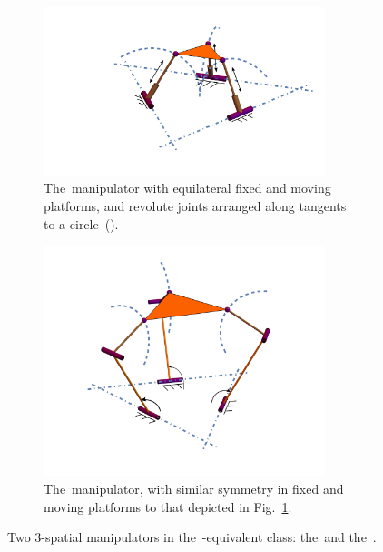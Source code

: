 \documentclass[DD]{iitmdiss}
\newcommand{\mref}[1]{\ref{#1}}
\newcommand{\mcite}[1]{\cite{#1}}
\newcommand{\mlabel}[1]{\label{#1}}
\begin{document}
\begin{figure}[h]
	\centering
	\begin{subfigure}{0.6\textwidth}
		\centering
		\includegraphics[width=0.9\textwidth]{rps0.png}
		\caption{The~\rps manipulator with equilateral fixed and moving platforms, and revolute joints arranged along tangents to a circle~(\mcite{hunt1978}).}
		\mlabel{fg:rps0}
	\end{subfigure}
	\begin{subfigure}{0.6\textwidth}
		\centering
		\includegraphics[width=0.9\textwidth]{rrs.png}
		\caption{The~\rrs manipulator, with similar symmetry in fixed and moving platforms to that depicted in Fig.~\mref{fg:rps0}.}
		\mlabel{fg:rrs0}
	\end{subfigure}
	\caption{Two 3-\dofs spatial manipulators in the~\rps-equivalent class: the~\rps and the~\rrs.}
\end{figure}
%
\end{document}
